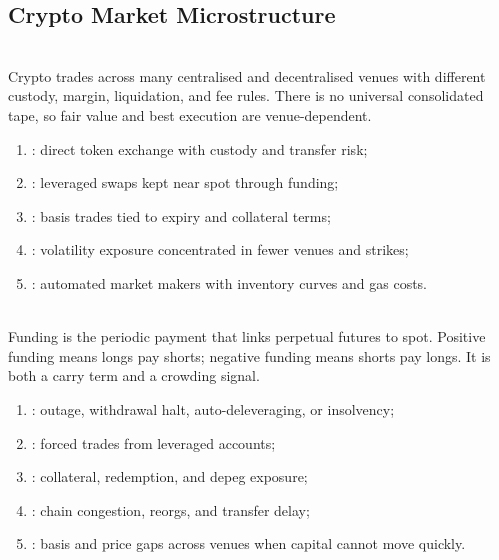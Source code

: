 \subsection{Crypto Market Microstructure}

\begin{principle} \\
Crypto trades across many centralised and decentralised venues with different custody, margin, liquidation, and fee rules. There is no universal consolidated tape, so fair value and best execution are venue-dependent.
\end{principle}

\begin{taxonomy} 
\begin{enumerate}[label=\roman*.]
\setlength{\itemsep}{0pt}
\item {}: direct token exchange with custody and transfer risk;
\item {}: leveraged swaps kept near spot through funding;
\item {}: basis trades tied to expiry and collateral terms;
\item {}: volatility exposure concentrated in fewer venues and strikes;
\item {}: automated market makers with inventory curves and gas costs.
\end{enumerate}
\end{taxonomy}

\begin{definition} \\
Funding is the periodic payment that links perpetual futures to spot. Positive funding means longs pay shorts; negative funding means shorts pay longs. It is both a carry term and a crowding signal.
\end{definition}

\begin{taxonomy} 
\begin{enumerate}[label=\roman*.]
\setlength{\itemsep}{0pt}
\item {}: outage, withdrawal halt, auto-deleveraging, or insolvency;
\item {}: forced trades from leveraged accounts;
\item {}: collateral, redemption, and depeg exposure;
\item {}: chain congestion, reorgs, and transfer delay;
\item {}: basis and price gaps across venues when capital cannot move quickly.
\end{enumerate}
\end{taxonomy}
